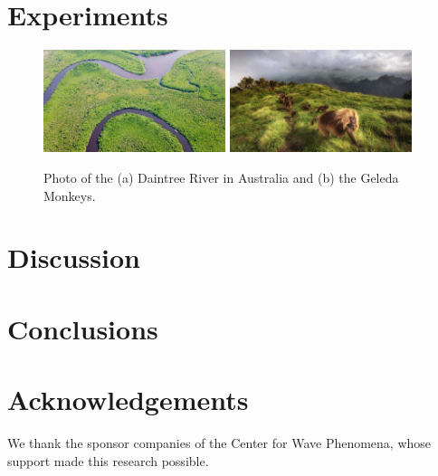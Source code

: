 \documentclass[onecolumn]{cwpreport} %
\begin{document}

\section{Experiments}
\lipsum[2-4]
\begin{figure}
    \centering
    \includegraphics[width=0.475\textwidth]{Fig/DaintreeRiver.jpg}  
    \includegraphics[width=0.475\textwidth]{Fig/GeledaMonkeys.jpg} 
    \caption{Photo of the (a) Daintree River in Australia and (b) the Geleda Monkeys.}
    \label{fig:model_volume}
\end{figure}

\section{Discussion}
\lipsum[2-4]

\section{Conclusions}
\lipsum[2-4]

\section{Acknowledgements}
We thank the sponsor companies of the Center for Wave Phenomena,
whose support made this research possible.






\end{document}
